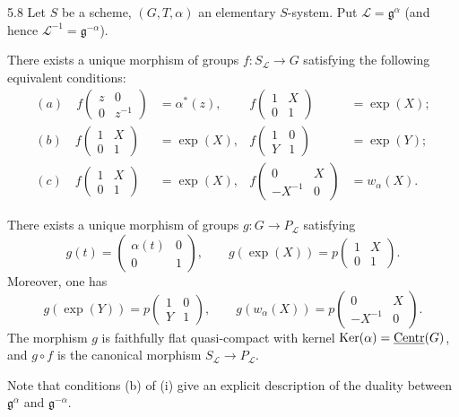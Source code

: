 \begin{proposition}{5.8}\label{XX.5.8}
Let $S$ be a scheme, $(G,T,\alpha)$ an elementary $S$-system. Put $\mathcal L=\mathfrak g^\alpha$ (and hence $\mathcal L^{-1}=\mathfrak g^{-\alpha}$).
\begin{enumeratei}
\item There exists a unique morphism of groups $f:S_{\mathcal L}\to G$ satisfying the following equivalent conditions:
\[
\begin{aligned}
(a)\quad f\begin{pmatrix}z&0\\0&z^{-1}\end{pmatrix}&=\alpha^*(z),& f\begin{pmatrix}1&X\\0&1\end{pmatrix}&=\exp(X);\\
(b)\quad f\begin{pmatrix}1&X\\0&1\end{pmatrix}&=\exp(X),& f\begin{pmatrix}1&0\\Y&1\end{pmatrix}&=\exp(Y);\\
(c)\quad f\begin{pmatrix}1&X\\0&1\end{pmatrix}&=\exp(X),& f\begin{pmatrix}0&X\\-X^{-1}&0\end{pmatrix}&=w_\alpha(X).
\end{aligned}
\]
\item There exists a unique morphism of groups $g:G\to P_{\mathcal L}$ satisfying
\[
g(t)=\begin{pmatrix}\alpha(t)&0\\0&1\end{pmatrix},\qquad g(\exp(X))=p\begin{pmatrix}1&X\\0&1\end{pmatrix}.
\]
Moreover, one has
\[
g(\exp(Y))=p\begin{pmatrix}1&0\\Y&1\end{pmatrix},\qquad
 g(w_\alpha(X))=p\begin{pmatrix}0&X\\-X^{-1}&0\end{pmatrix}.
\]
The morphism $g$ is faithfully flat quasi-compact with kernel $\operatorname{Ker}(\alpha)=\underline{\mathrm{Centr}}(G)$, and $g\circ f$ is the canonical morphism $S_{\mathcal L}\to P_{\mathcal L}$.
\end{enumeratei}
\end{proposition}
Note that conditions (b) of (i) give an explicit description of the duality between $\mathfrak g^\alpha$ and $\mathfrak g^{-\alpha}$.

